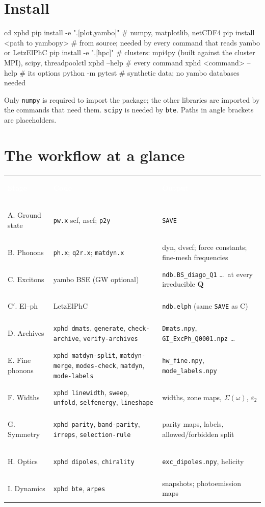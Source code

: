 \documentclass[10pt,a4paper]{article}
\newcommand{\hd}[1]{\textcolor{white}{\normalfont\bfseries #1}}
\newcommand{\hdrow}{\rowcolor{accent}}
\newcommand{\bQ}{\mathbf{Q}}
\begin{document}
\section{Install}
\begin{cmd}
cd xphd
pip install -e ".[plot,yambo]"      # numpy, matplotlib, netCDF4
pip install <path to yambopy>        # from source; needed by every command that reads yambo or LetzElPhC
pip install -e ".[hpc]"              # clusters: mpi4py (built against the cluster MPI), scipy, threadpoolctl
xphd --help                          # every command
xphd <command> --help                # its options
python -m pytest                     # synthetic data; no yambo databases needed
\end{cmd}
Only \texttt{numpy} is required to import the package; the other libraries are imported by the commands that need them.
\texttt{scipy} is needed by \texttt{bte}. Paths in angle brackets are placeholders.

\section{The workflow at a glance}
{\small\renewcommand{\arraystretch}{1.25}
\begin{tabularx}{\linewidth}{>{\bfseries\raggedright\arraybackslash}p{2.3cm}>{\raggedright\arraybackslash}p{5.8cm}>{\raggedright\arraybackslash}X}
\hdrow \hd{Stage} & \hd{Code} & \hd{Output}\\
A. Ground state & \texttt{pw.x} scf, nscf; \texttt{p2y} & \texttt{SAVE}\\
B. Phonons & \texttt{ph.x}; \texttt{q2r.x}; \texttt{matdyn.x} & dyn, dvscf; force constants; fine-mesh frequencies\\
C. Excitons & yambo BSE (GW optional) & \texttt{ndb.BS\_diago\_Q1} \ldots\ at every irreducible $\bQ$\\
C$'$. El--ph & LetzElPhC & \texttt{ndb.elph} (same \texttt{SAVE} as C)\\
D. Archives & \texttt{xphd dmats}, \texttt{generate}, \texttt{check-archive}, \texttt{verify-archives} & \texttt{Dmats.npy}, \texttt{GI\_ExcPh\_Q0001.npz} \ldots\\
E. Fine phonons & \texttt{xphd matdyn-split}, \texttt{matdyn-merge}, \texttt{modes-check}, \texttt{matdyn}, \texttt{mode-labels} & \texttt{hw\_fine.npy}, \texttt{mode\_labels.npy}\\
F. Widths & \texttt{xphd linewidth}, \texttt{sweep}, \texttt{unfold}, \texttt{selfenergy}, \texttt{lineshape} & widths, zone maps, $\Sigma(\omega)$, $\varepsilon_2$\\
G. Symmetry & \texttt{xphd parity}, \texttt{band-parity}, \texttt{irreps}, \texttt{selection-rule} & parity maps, labels, allowed/forbidden split\\
H. Optics & \texttt{xphd dipoles}, \texttt{chirality} & \texttt{exc\_dipoles.npy}, helicity\\
I. Dynamics & \texttt{xphd bte}, \texttt{arpes} & snapshots; photoemission maps\\
\end{tabularx}}
\end{document}
